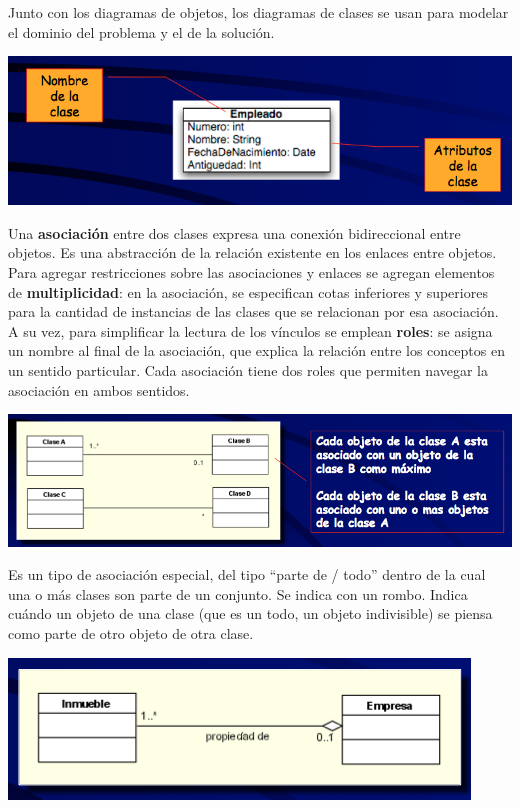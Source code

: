\documentclass[]{article}
\begin{document}
Junto con los diagramas de objetos, los diagramas de clases se usan para modelar el dominio del problema y el de la solución.

\begin{center}
	\includegraphics[scale=0.5]{Conceptual.png}
\end{center}

Una \textbf{asociación} entre dos clases expresa una conexión bidireccional entre objetos. Es una abstracción de la relación existente en los enlaces entre objetos. Para agregar restricciones sobre las asociaciones y enlaces se agregan elementos de \textbf{multiplicidad}: en la asociación, se especifican cotas inferiores y superiores para la cantidad de instancias de las clases que se relacionan por esa asociación. A su vez, para simplificar la lectura de los vínculos se emplean \textbf{roles}: se asigna un nombre al final de la asociación, que explica la relación entre los conceptos en un sentido particular. Cada asociación tiene dos roles que permiten navegar la asociación en ambos sentidos.

\begin{center}
	\includegraphics[scale=0.5]{Asociacion.png}
\end{center}

Es un tipo de asociación especial, del tipo ``parte de / todo'' dentro de la cual una o más clases son parte de un conjunto. Se indica con un rombo. Indica cuándo un objeto de una clase (que es un todo, un objeto indivisible) se piensa como parte de otro objeto de otra clase.

\begin{center}
	\includegraphics[scale=0.6]{Agregacion.png}
\end{center}
\end{document}
